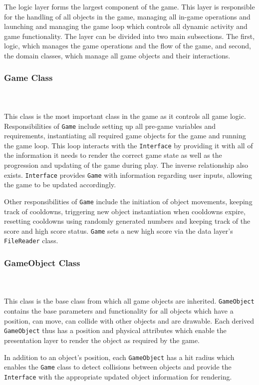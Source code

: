 \documentclass[10pt,twocolumn]{witseiepaper}
\begin{document}
The logic layer forms the largest component of the game. This layer is responsible for the handling of all objects in the game, managing all in-game operations and launching and managing the game loop which controls all dynamic activity and game functionality. The layer can be divided into two main subsections. The first, logic, which manages the game operations and the flow of the game, and second, the domain classes, which manage all game objects and their interactions. 

\subsubsection{Game Class}
~\\
~\\
This class is the most important class in the game as it controls all game logic. Responsibilities of \texttt{Game} include setting up all pre-game variables and requirements, instantiating all required game objects for the game and running the game loop. This loop interacts with the \texttt{Interface} by providing it with all of the information it needs to render the correct game state as well as the progression and updating of the game during play. The inverse relationship also exists. \texttt{Interface} provides \texttt{Game} with information regarding user inputs, allowing the game to be updated accordingly. 

Other responsibilities of \texttt{Game} include the initiation of object movements, keeping track of cooldowns, triggering new object instantiation when cooldowns expire, resetting cooldowns using randomly generated numbers and keeping track of the score and high score status. \texttt{Game} sets a new high score via the data layer's \texttt{FileReader} class. 


\subsubsection{GameObject Class}
~\\
~\\
 This class is the base class from which all game objects are inherited. \texttt{GameObject} contains the base parameters and functionality for all objects which have a position, can move, can collide with other objects and are drawable. Each derived \texttt{GameObject} thus has a position and physical attributes which enable the presentation layer to render the object as required by the game.
 
 In addition to an object's position, each \texttt{GameObject} has a hit radius which enables the \texttt{Game} class to detect collisions between objects and provide the \texttt{Interface} with the appropriate updated object information for rendering.
 
\end{document}
